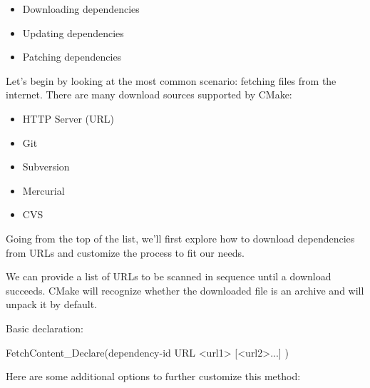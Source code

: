 \begin{itemize}
\item
Downloading dependencies

\item
Updating dependencies
\item
Patching dependencies
\end{itemize}

Let’s begin by looking at the most common scenario: fetching files from the internet. There are many download sources supported by CMake:

\begin{itemize}
\item
HTTP Server (URL)

\item
Git

\item
Subversion

\item
Mercurial

\item
CVS
\end{itemize}

Going from the top of the list, we’ll first explore how to download dependencies from URLs and customize the process to fit our needs.


We can provide a list of URLs to be scanned in sequence until a download succeeds. CMake will recognize whether the downloaded file is an archive and will unpack it by default.

Basic declaration:

\begin{shell}
FetchContent_Declare(dependency-id
                     URL <url1> [<url2>...]
)
\end{shell}

Here are some additional options to further customize this method:

